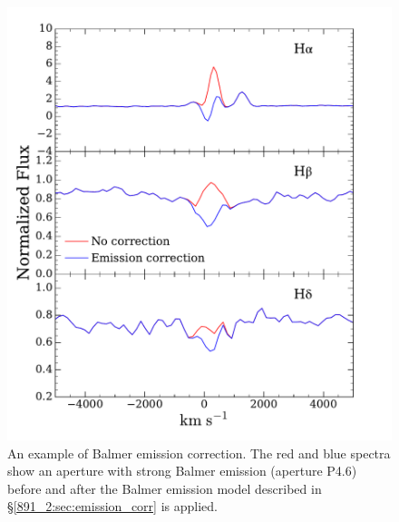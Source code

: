 
\begin{figure}
  \centering
  \includegraphics[width=\columnwidth]{891_2/figs/emission_comp_zoom.pdf}
  \caption[Spectra before and after Balmer emission
    correction]{\fixspacing\label{891_2:fig:emission_comp}An example
    of Balmer emission correction. The red and blue spectra show an
    aperture with strong Balmer emission (aperture P4.6) before and
    after the Balmer emission model described in
    \S\ref{891_2:sec:emission_corr} is applied.}
\end{figure}


